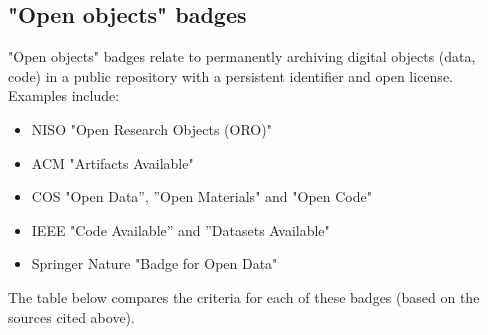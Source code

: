 \subsection{"Open objects" badges}

"Open objects" badges relate to permanently archiving digital objects (data, code) in a public repository with a persistent identifier and open license.\autocite{niso_reproducibility_badging_and_definitions_working_group_reproducibility_2021} Examples include:
\begin{itemize}
    \item NISO "Open Research Objects (ORO)"\autocite{niso_reproducibility_badging_and_definitions_working_group_reproducibility_2021}
    \item ACM "Artifacts Available"\autocite{association_for_computing_machinery_acm_artifact_2020}
    \item COS "Open Data”, ”Open Materials" and "Open Code"\autocite{blohowiak_badges_2023}
    \item IEEE "Code Available” and ”Datasets Available"\autocite{institute_of_electrical_and_electronics_engineers_ieee_about_nodate}
    \item Springer Nature "Badge for Open Data"\autocite{springer_nature_springer_2018}
\end{itemize}

The table below compares the criteria for each of these badges (based on the sources cited above).

